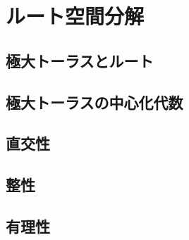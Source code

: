 \documentclass[rep_main]{subfiles}
\begin{document}
\section{ルート空間分解}

\subsection{極大トーラスとルート}
\subsection{極大トーラスの中心化代数}
\subsection{直交性}
\subsection{整性}
\subsection{有理性}
\end{document}
